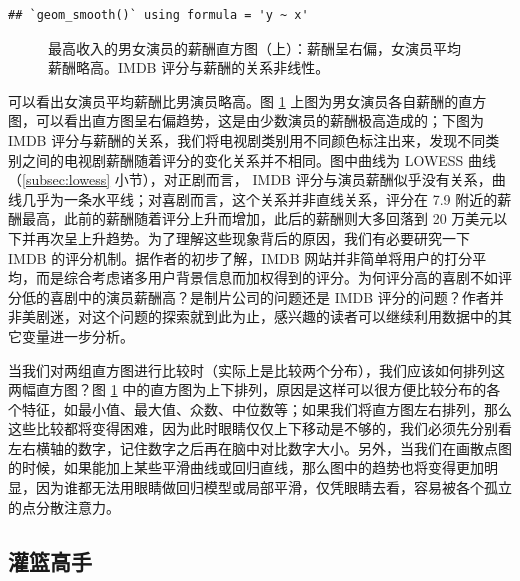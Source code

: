 \documentclass[
  b5paper,
  UTF8,twoside]{book}
\begin{document}
\begin{verbatim}
## `geom_smooth()` using formula = 'y ~ x'
\end{verbatim}

\begin{figure}

{\centering {}\newline{}\newline

}

\caption[演员的薪酬直方图及薪酬与电视剧评分的散点图]{最高收入的男女演员的薪酬直方图（上）：薪酬呈右偏，女演员平均薪酬略高。IMDB 评分与薪酬的关系非线性。}\label{fig:tvearn}
\end{figure}



可以看出女演员平均薪酬比男演员略高。图 \ref{fig:tvearn} 上图为男女演员各自薪酬的直方图，可以看出直方图呈右偏趋势，这是由少数演员的薪酬极高造成的；下图为 IMDB 评分与薪酬的关系，我们将电视剧类别用不同颜色标注出来，发现不同类别之间的电视剧薪酬随着评分的变化关系并不相同。图中曲线为 LOWESS 曲线（\ref{subsec:lowess} 小节），对正剧而言， IMDB 评分与演员薪酬似乎没有关系，曲线几乎为一条水平线；对喜剧而言，这个关系并非直线关系，评分在 7.9 附近的薪酬最高，此前的薪酬随着评分上升而增加，此后的薪酬则大多回落到 20 万美元以下并再次呈上升趋势。为了理解这些现象背后的原因，我们有必要研究一下 IMDB 的评分机制。据作者的初步了解，IMDB 网站并非简单将用户的打分平均，而是综合考虑诸多用户背景信息而加权得到的评分。为何评分高的喜剧不如评分低的喜剧中的演员薪酬高？是制片公司的问题还是 IMDB 评分的问题？作者并非美剧迷，对这个问题的探索就到此为止，感兴趣的读者可以继续利用数据中的其它变量进一步分析。

当我们对两组直方图进行比较时（实际上是比较两个分布），我们应该如何排列这两幅直方图？图 \ref{fig:tvearn} 中的直方图为上下排列，原因是这样可以很方便比较分布的各个特征，如最小值、最大值、众数、中位数等；如果我们将直方图左右排列，那么这些比较都将变得困难，因为此时眼睛仅仅上下移动是不够的，我们必须先分别看左右横轴的数字，记住数字之后再在脑中对比数字大小。另外，当我们在画散点图的时候，如果能加上某些平滑曲线或回归直线，那么图中的趋势也将变得更加明显，因为谁都无法用眼睛做回归模型或局部平滑，仅凭眼睛去看，容易被各个孤立的点分散注意力。

\subsection{灌篮高手}\label{ux704cux7beeux9ad8ux624b}
\end{document}
